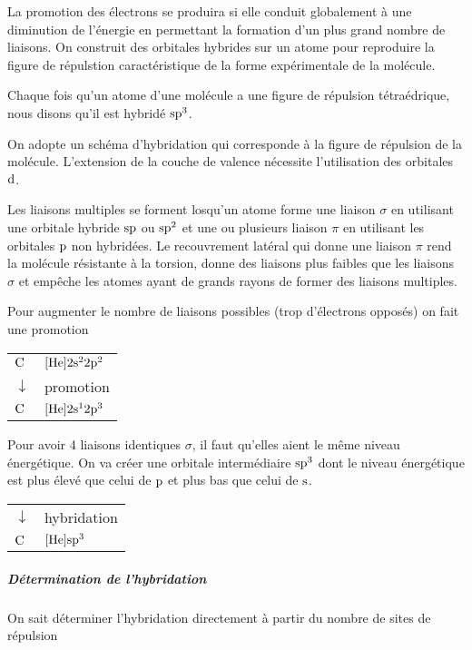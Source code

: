 
La promotion des électrons se produira si elle conduit globalement à une diminution de l'énergie en permettant la formation d'un plus grand nombre de liaisons.
On construit des orbitales hybrides sur un atome pour reproduire la figure de répulstion caractéristique de la forme expérimentale de la molécule.

Chaque fois qu'un atome d'une molécule a une figure de répulsion tétraédrique,
nous disons qu'il est hybridé $\mathrm{s}\mathrm{p}^3$.

On adopte un schéma d'hybridation qui corresponde à la figure de répulsion de la molécule.
L'extension de la couche de valence nécessite l'utilisation des orbitales $\mathrm{d}$.

Les liaisons multiples se forment losqu'un atome forme une liaison $\sigma$ en utilisant une orbitale hybride $\mathrm{s}\mathrm{p}$ ou $\mathrm{s}\mathrm{p}^2$ et une ou plusieurs liaison $\pi$ en utilisant les orbitales $\mathrm{p}$ non hybridées.
Le recouvrement latéral qui donne une liaison $\pi$ rend la molécule résistante à la torsion,
donne des liaisons plus faibles que les liaisons $\sigma$ et empêche les atomes ayant de grands rayons de former des liaisons multiples.


Pour augmenter le nombre de liaisons possibles (trop d'électrons opposés) on fait une promotion
\begin{center}
  \begin{tabular}{ll}
    $\ce{C}$ & $[\ce{He}]2\sorb^22\porb^2$\\
    $\downarrow$ &  promotion\\
    $\ce{C}$ & $[\ce{He}]2\sorb^12\porb^3$
  \end{tabular}
\end{center}

Pour avoir 4 liaisons identiques $\sigma$, %
il faut qu'elles aient le même niveau énergétique.
On va créer une orbitale intermédiaire $\mathrm{s}\mathrm{p}^3$ dont le niveau énergétique est plus élevé que celui de $\mathrm{p}$ et plus bas que celui de $\mathrm{s}$.

\begin{center}
  \begin{tabular}{ll}
    $\downarrow$ &  hybridation\\
    $\ce{C}$ & $[\ce{He}]\sorb\porb^3$
  \end{tabular}
\end{center}

\subparagraph{Détermination de l'hybridation}
On sait déterminer l'hybridation directement à partir du nombre de sites de répulsion

